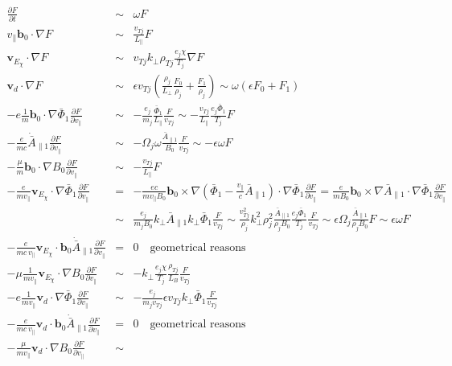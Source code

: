 \begin{eqnarray*}
  \frac{\partial F}{\partial t}&\sim&\omega F\\
  v_\|\mathbf{b}_0\cdot\nabla F&\sim&\frac{v_{Tj}}{L_\|}F\\
  \mathbf{v}_{E_\chi}\cdot\nabla F
  &\sim&v_{Tj}k_\bot\rho_{Tj}\frac{e_j\chi}{T_j}\nabla F\\
  \mathbf{v}_d\cdot\nabla F
  &\sim&\epsilon v_{Tj}\left(
    \frac{\rho_j}{L_\bot}\frac{F_0}{\rho_j}
    +\frac{F_1}{\rho_j}
  \right)
  \sim\omega\left(
    \epsilon F_0
    +F_1
  \right)\\
  -e\frac{1}{m}\mathbf{b}_0\cdot\nabla\bar{\Phi}_1
  \frac{\partial F}{\partial v_\|}
  &\sim&-\frac{e_j}{m_j}\frac{\bar{\Phi}_1}{L_\|}
  \frac{F}{v_{Tj}}
  \sim -\frac{v_{Tj}}{L_\|}\frac{e_j\bar{\Phi}_1}{T_j} F\\
  -\frac{e}{mc}\dot{\bar{A}}_{\|1}\frac{\partial F}{\partial v_\|}
  &\sim&-\Omega_j\omega\frac{\bar{A}_{\|1}}{B_0}\frac{F}{v_{Tj}}
  \sim -\epsilon\omega F\\
  -\frac{\mu}{m}\mathbf{b}_0\cdot\nabla B_0
  \frac{\partial F}{\partial v_\|}
  &\sim& -\frac{v_{Tj}}{L_\|} F\\
  -\frac{e}{mv_\|}\mathbf{v}_{E_\chi}\cdot\nabla\bar{\Phi}_1
  \frac{\partial F}{\partial v_\|}
  &=&-\frac{ec}{mv_\|B_0}
  \mathbf{b}_0\times\nabla\left(
    \bar\Phi_1
    -\frac{v_\|}{c}\bar{A}_{\|1}
  \right)\cdot\nabla\bar{\Phi}_1
  \frac{\partial F}{\partial v_\|}
  =\frac{e}{mB_0}
  \mathbf{b}_0\times\nabla\bar{A}_{\|1}
  \cdot\nabla\bar{\Phi}_1
  \frac{\partial F}{\partial v_\|}\\
  &\sim&\frac{e_j}{m_jB_0}k_\bot\bar{A}_{\|1}
  k_\bot\bar{\Phi}_1\frac{F}{v_{Tj}}
  \sim\frac{v_{Tj}^2}{\rho_j}k_\bot^2\rho_j^2\frac{\bar{A}_{\|1}}{\rho_jB_0}
  \frac{e_j\bar{\Phi}_1}{T_j}\frac{F}{v_{Tj}}
  \sim\epsilon\Omega_j \frac{\bar{A}_{\|1}}{\rho_jB_0} F
  \sim\epsilon\omega F\\
  -\frac{e}{mc\,v_\|}\mathbf{v}_{E_\chi}\cdot\mathbf{b}_0
  \dot{\bar{A}}_{\|1}\frac{\partial F}{\partial v_\|}
  &=&0\quad\mbox{geometrical reasons}\\
  -\mu\frac{1}{mv_\|}\mathbf{v}_{E_\chi}
  \cdot\nabla B_0\frac{\partial F}{\partial v_\|}
  &\sim&-k_\bot\frac{e_j\chi}{T_j}
  \frac{\rho_{Tj}}{L_B}\frac{F}{v_{Tj}}\\
  -e\frac{1}{mv_\|}\mathbf{v}_d\cdot\nabla\bar{\Phi}_1
  \frac{\partial F}{\partial v_\|}
  &\sim& -\frac{e_j}{m_jv_{Tj}}\epsilon v_{Tj} k_\bot\bar{\Phi}_1
  \frac{F}{v_{Tj}}\\
  -\frac{e}{mc\,v_\|}\mathbf{v}_d\cdot\mathbf{b}_0
  \dot{\bar{A}}_{\|1}\frac{\partial F}{\partial v_\|}
  &=&0\quad\mbox{geometrical reasons}\\
  -\frac{\mu}{mv_\|}\mathbf{v}_d\cdot\nabla B_0\frac{\partial F}{\partial v_\|}&\sim&
\end{eqnarray*}

